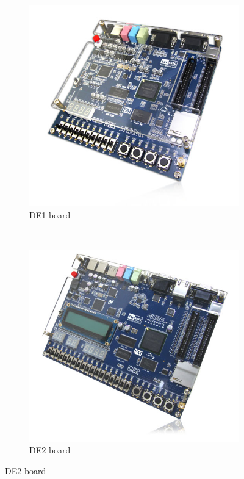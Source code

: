 \documentclass[12pt, logo=tehranDLDL/ut]{tehranDLDL}
\begin{document}
\begin{figure}[!b]
    \centering
    \caption{DE1 and DE2 Development Boards}
    \begin{subfigure}{0.48\textwidth}
        \centering
        \caption{DE1 board\label{fig:de1}}
        \includegraphics[width=\textwidth]{de1.jpg}
    \end{subfigure}
    ~
    \begin{subfigure}{0.48\textwidth}
        \centering
        \caption{DE2 board\label{fig:de2}}
        \includegraphics[width=\textwidth]{de2.jpg}
    \end{subfigure}
\end{figure}
\end{document}
